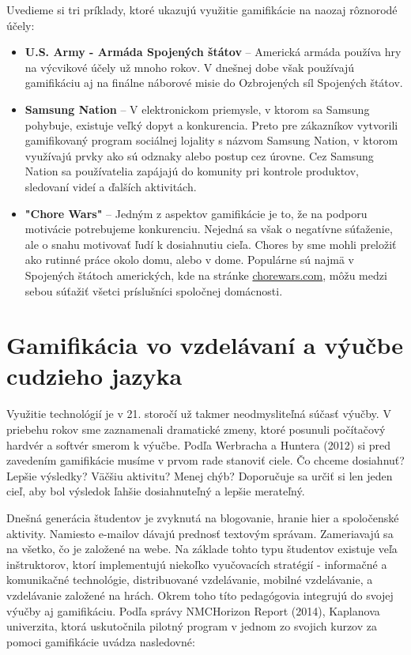\documentclass{article}
\begin{document}
Uvedieme si tri príklady, ktoré ukazujú využitie gamifikácie na naozaj rôznorodé účely:
\begin{itemize}
\item \textbf{U.S. Army - Armáda Spojených štátov} – Americká armáda používa hry na výcvikové účely už mnoho rokov. V dnešnej dobe však používajú gamifikáciu aj na finálne náborové misie do Ozbrojených síl Spojených štátov\cite{hlavnyclanok}.
\item \textbf{Samsung Nation} – V elektronickom priemysle, v ktorom sa Samsung pohybuje, existuje veľký dopyt a konkurencia. Preto pre zákazníkov vytvorili gamifikovaný program sociálnej lojality s názvom Samsung Nation, v ktorom využívajú prvky ako sú odznaky alebo postup cez úrovne. Cez Samsung Nation sa používatelia zapájajú do komunity pri kontrole produktov, sledovaní videí a ďalších aktivitách\cite{hlavnyclanok}.
\item \textbf{"Chore Wars"} – Jedným z aspektov gamifikácie je to, že na podporu motivácie potrebujeme konkurenciu. Nejedná sa však o negatívne súťaženie, ale o snahu motivovať ľudí k dosiahnutiu cieľa. Chores by sme mohli preložiť ako rutinné práce okolo domu, alebo v dome. Populárne sú najmä v Spojených štátoch amerických, kde na stránke \href{http://www.chorewars.com}{chorewars.com}, môžu medzi sebou súťažiť všetci príslušníci spoločnej domácnosti\cite{hlavnyclanok}.
\end{itemize}

\section {Gamifikácia vo vzdelávaní a výučbe cudzieho jazyka}\label{vovzdelavani}

Využitie technológií je v 21. storočí už takmer neodmysliteľná súčasť výučby. V priebehu rokov sme zaznamenali dramatické zmeny, ktoré posunuli počítačový hardvér a softvér smerom k výučbe.
Podľa Werbracha a Huntera (2012) si pred zavedením gamifikácie musíme v prvom rade stanoviť ciele\cite{werbach}. Čo chceme dosiahnuť? Lepšie výsledky? Väčšiu aktivitu? Menej chýb? Doporučuje sa určiť si len jeden cieľ, aby bol výsledok ľahšie dosiahnuteľný a lepšie merateľný.

Dnešná generácia študentov je zvyknutá na blogovanie, hranie hier a spoločenské aktivity. Namiesto e-mailov dávajú prednosť textovým správam. Zameriavajú sa na všetko, čo je založené na webe. Na základe tohto typu študentov existuje veľa inštruktorov, ktorí implementujú niekoľko vyučovacích stratégií - informačné a komunikačné technológie, distribuované vzdelávanie, mobilné vzdelávanie, a vzdelávanie založené na hrách\cite{hlavnyclanok}. Okrem toho títo pedagógovia integrujú do svojej výučby aj gamifikáciu. Podľa správy NMCHorizon Report (2014), Kaplanova univerzita, ktorá uskutočnila pilotný program v jednom zo svojich kurzov za pomoci gamifikácie uvádza nasledovné:
\end{document}

